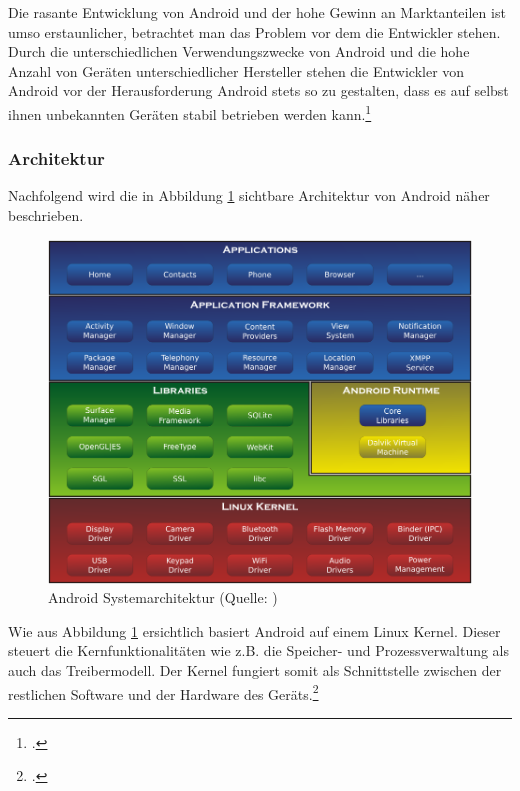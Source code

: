 Die rasante Entwicklung von Android und der hohe Gewinn an Marktanteilen ist umso erstaunlicher, betrachtet man das Problem vor dem die Entwickler stehen. Durch die unterschiedlichen Verwendungszwecke von Android und die hohe Anzahl von Geräten unterschiedlicher Hersteller stehen die Entwickler von Android vor der Herausforderung Android stets so zu gestalten, dass es auf selbst ihnen unbekannten Geräten stabil betrieben werden kann.\footcite[vgl.:][]{androidVSios}

\subsubsection{Architektur}
Nachfolgend wird die in Abbildung \ref{figAndroidSystem} sichtbare Architektur von Android näher beschrieben.

\begin{figure}[h]
	\centering
  \includegraphics[scale=0.4]{images/Android-System-Architecture.png}
	\caption{Android Systemarchitektur (Quelle: \cite[][]{androidArchitektur})}
	\label{figAndroidSystem}
\end{figure}

Wie aus Abbildung \ref{figAndroidSystem} ersichtlich basiert Android auf einem Linux Kernel. Dieser steuert die Kernfunktionalitäten wie z.B. die Speicher- und Prozessverwaltung als auch das Treibermodell. Der Kernel fungiert somit als Schnittstelle zwischen der restlichen Software und der Hardware des Geräts.\footcite[vgl.:][S. 28 f.]{androidHandbuch}

